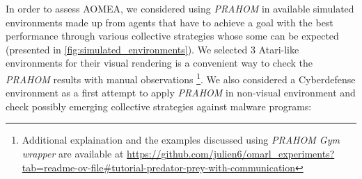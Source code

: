 \documentclass[runningheads]{llncs}
\begin{document}






In order to assess AOMEA, we considered using \emph{PRAHOM} in available simulated environments made up from agents that have to achieve a goal with the best performance through various collective strategies whose some can be expected (presented in \autoref{fig:simulated_environments}).
We selected 3 Atari-like environments for their visual rendering is a convenient way to check the \emph{PRAHOM} results with manual observations
\footnote{Additional explaination and the examples discussed using \emph{PRAHOM Gym wrapper} are available at \url{https://github.com/julien6/omarl_experiments?tab=readme-ov-file\#tutorial-predator-prey-with-communication}}.
We also considered a Cyberdefense environment as a first attempt to apply \emph{PRAHOM} in non-visual environment and check possibly emerging collective strategies against malware programs:

\phantom{X}
\end{document}
